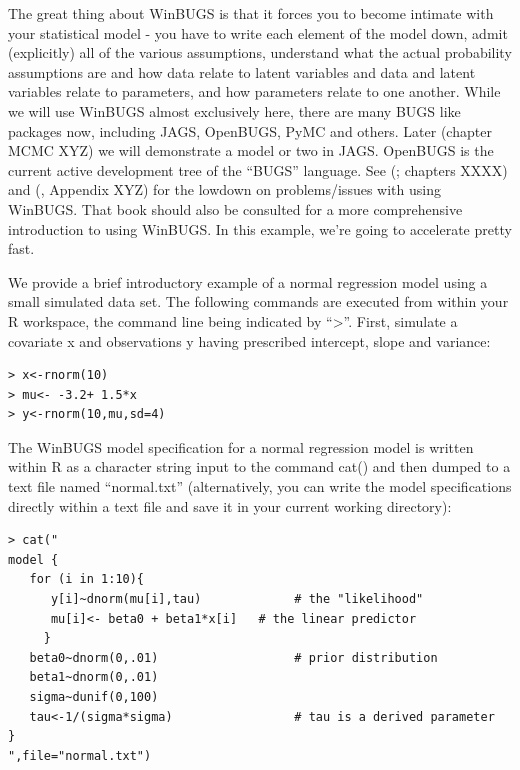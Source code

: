 The great thing about WinBUGS is that it forces you to become intimate
with your statistical model - you have to write each element of the
model down, admit (explicitly) all of the various assumptions,
understand what the actual probability assumptions are and how data
relate to latent variables and data and latent variables relate to
parameters, and how parameters relate to one another. While we will
use WinBUGS almost exclusively here, there are many BUGS like packages
now, including JAGS, OpenBUGS, PyMC and others.  Later (chapter MCMC
XYZ) we will demonstrate a model or two in JAGS. OpenBUGS is the
current active development tree of the ``BUGS'' language. See
(\citet{kery:2010}; chapters XXXX) and (\citet{kery_schaub:2011}, Appendix XYZ) for the lowdown on problems/issues with using WinBUGS. That book should also be consulted for a more comprehensive introduction to using WinBUGS. In this example, we're going to accelerate pretty fast.

We  provide a brief introductory example of a normal regression model using a small simulated data set. The following commands are executed from within your R workspace, the command line being indicated by ``>''. First, simulate a covariate x and observations y having prescribed intercept, slope and variance:
\begin{verbatim}
> x<-rnorm(10)
> mu<- -3.2+ 1.5*x
> y<-rnorm(10,mu,sd=4)
\end{verbatim}
The WinBUGS model specification for a normal regression model is written within R as a character string input to the command cat() and then dumped to a text file named ``normal.txt'' (alternatively, you can write the model specifications directly within a text file and save it in your current working directory):
\begin{verbatim}
> cat("
model {
   for (i in 1:10){
      y[i]~dnorm(mu[i],tau)             # the "likelihood"
      mu[i]<- beta0 + beta1*x[i]   # the linear predictor
     }
   beta0~dnorm(0,.01)                   # prior distribution
   beta1~dnorm(0,.01)
   sigma~dunif(0,100)
   tau<-1/(sigma*sigma)                 # tau is a derived parameter
}
",file="normal.txt")
\end{verbatim}



